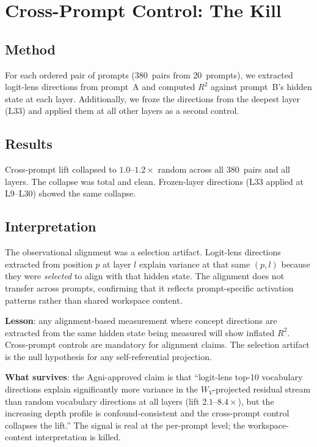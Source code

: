 \documentclass[11pt,a4paper]{article}
\begin{document}
\section{Cross-Prompt Control: The Kill}
\label{sec:crossprompt}

\subsection{Method}

For each ordered pair of prompts (380~pairs from 20~prompts), we
extracted logit-lens directions from prompt~A and computed $R^2$
against prompt~B's hidden state at each layer. Additionally, we
froze the directions from the deepest layer (L33) and applied them
at all other layers as a second control.

\subsection{Results}

Cross-prompt lift collapsed to $1.0$--$1.2\times$ random across all
380~pairs and all layers. The collapse was total and clean. Frozen-layer
directions (L33 applied at L9--L30) showed the same collapse.

\subsection{Interpretation}

The observational alignment was a selection artifact. Logit-lens
directions extracted from position $p$ at layer $l$ explain variance
at that same $(p, l)$ because they were \emph{selected} to align with
that hidden state. The alignment does not transfer across prompts,
confirming that it reflects prompt-specific activation patterns rather
than shared workspace content.

\textbf{Lesson}: any alignment-based measurement where concept
directions are extracted from the same hidden state being measured will
show inflated $R^2$. Cross-prompt controls are mandatory for alignment
claims. The selection artifact is the null hypothesis for any
self-referential projection.

\textbf{What survives}: the Agni-approved claim is that ``logit-lens
top-10 vocabulary directions explain significantly more variance in the
$W_V$-projected residual stream than random vocabulary directions at
all layers (lift $2.1$--$8.4\times$), but the increasing depth profile
is confound-consistent and the cross-prompt control collapses the
lift.'' The signal is real at the per-prompt level; the workspace-content
interpretation is killed.
\end{document}
